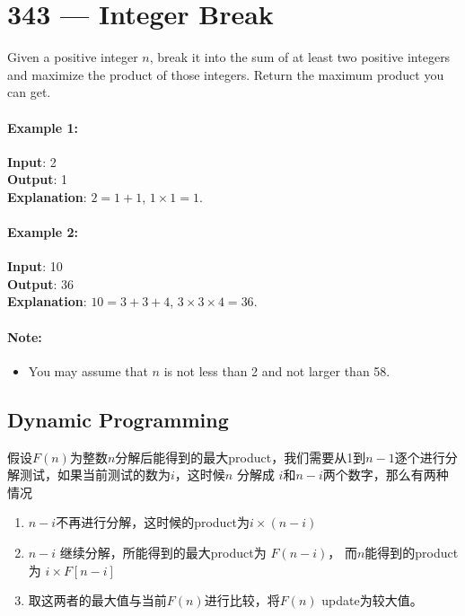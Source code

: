 \section{343 --- Integer Break}
Given a positive integer $ n $, break it into the sum of at least two positive integers and maximize the product of those integers. Return the maximum product you can get.

\paragraph{Example 1:}

\begin{flushleft}
\textbf{Input}: 2
\\
\textbf{Output}: 1
\\
\textbf{Explanation}: $2 = 1 + 1$, $1 \times 1 = 1$.
\end{flushleft}

\paragraph{Example 2:}

\begin{flushleft}
\textbf{Input}: 10
\\
\textbf{Output}: 36
\\
\textbf{Explanation}: $10 = 3 + 3 + 4$, $3 \times 3 \times 4 = 36$.
\end{flushleft}

\paragraph{Note:} 
\begin{itemize}
\item You may assume that $ n $ is not less than 2 and not larger than 58.
\end{itemize}

\subsection{Dynamic Programming}
假设$ F(n) $为整数$n$分解后能得到的最大product，我们需要从1到$ n-1 $逐个进行分解测试，如果当前测试的数为$ i $，这时候$ n $ 分解成 $ i $和$ n-i $两个数字，那么有两种情况

\begin{enumerate}
\item $ n-i $不再进行分解，这时候的product为$i \times (n-i)$
\item $n-i$ 继续分解，所能得到的最大product为 $ F(n-i) $， 而$ n $能得到的product为 $ i\times F[n-i] $
\item 取这两者的最大值与当前$ F(n) $进行比较，将$ F(n) $ update为较大值。
\end{enumerate}

